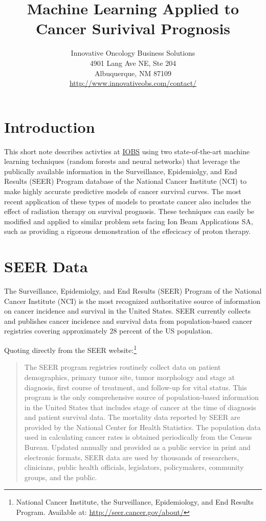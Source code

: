 \documentclass{article}
\title{Machine Learning Applied to Cancer Surivival Prognosis}
\author{Innovative Oncology Business Solutions \\
 4901 Lang Ave NE, Ste 204 \\
Albuquerque, NM 87109 \\
\url{http://www.innovativeobs.com/contact/}}
\date{}
\begin{document}
\maketitle



\section{Introduction}

This short note describes activties at 
\href{http://www.innovativeobs.com/}{IOBS} using two state-of-the-art machine learning techniques (random forests and neural networks) 
that leverage the publically available information in the Surveillance, Epidemiolgy, and End Results (SEER) Program database of the National Cancer Institute (NCI) to make highly accurate predictive models of cancer survival curves. The most recent application of these types of models to prostate cancer also includes the effect of radiation therapy on survival prognosis. These techniques can easily be modified and applied to similar problem sets facing 
Ion Beam Applications SA, such as providing a rigorous demonstration of the effecicacy of proton therapy.



 



\section{SEER Data}

The Surveillance, Epidemiolgy, and End Results (SEER) Program of the National Cancer Institute (NCI) is the most recognized authoritative source of information on cancer incidence and survival in the United States. SEER currently collects and publishes cancer incidence and survival data from population-based cancer registries covering approximately 28 percent of the US population.

Quoting directly from the SEER
website:\footnote{National Cancer Institute, the Surveillance, Epidemiology, and End Results Program. Available at: \url{http://seer.cancer.gov/about/}}

\begin{quote}
The SEER program registries routinely collect data on patient demographics, primary tumor site, tumor morphology and stage at diagnosis, first course of treatment, and follow-up for vital status. This program is the only comprehensive source of population-based information in the United States that includes stage of cancer at the time of diagnosis and patient survival data. The mortality data reported by SEER are provided by the National Center for Health Statistics. The population data used in calculating cancer rates is obtained periodically from the Census Bureau. Updated annually and provided as a public service in print and electronic formats, SEER data are used by thousands of researchers, clinicians, public health officials, legislators, policymakers, community groups, and the public.
\end{quote}
\end{document}
